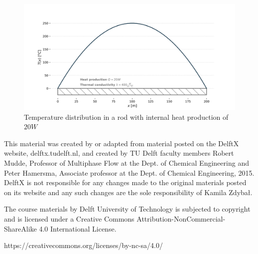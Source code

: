 \documentclass[10pt]{article}
\begin{document}
\begin{figure}[H]
\centering\includegraphics[width=18cm]{temperature_distribution.png}
\caption{Temperature distribution in a rod with internal heat production of $20 W$}
\label{fig:learning_curve}
\end{figure}

\setlength{\parskip}{0.0em}
\setlength{\parindent}{0cm}

\newpage

\thispagestyle{empty}

\vspace*{1cm}

This material was created by or adapted from material posted on the DelftX website, delftx.tudelft.nl, and created by TU Delft faculty members Robert Mudde, Professor of Multiphase Flow at the Dept. of Chemical Engineering and Peter Hamersma, Associate professor at the Dept. of Chemical Engineering, 2015. DelftX is not responsible for any changes made to the original materials posted on its website and any such changes are the sole responsibility of Kamila Zdybał.

The course materials by Delft University of Technology is subjected to copyright and is licensed under a Creative Commons Attribution-NonCommercial-ShareAlike 4.0 International License.

https://creativecommons.org/licenses/by-nc-sa/4.0/
\end{document}
